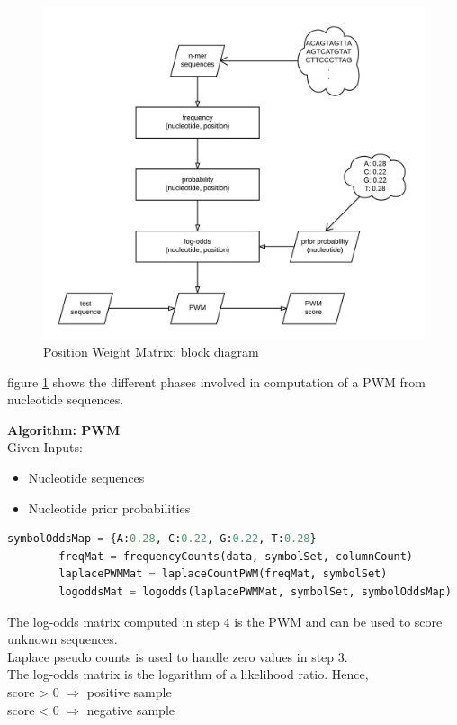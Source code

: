 \documentclass[12pt,a4paper]{article}
\begin{document}
	\begin{figure}[H]
		\label{fig:pwm}
		\includegraphics[width=\textwidth]{"pwm"}
		\caption{Position Weight Matrix: block diagram}
		\centering
	\end{figure}
	
	figure \ref{fig:pwm} shows the different phases involved in computation of a PWM from nucleotide sequences. \par
	\textbf{Algorithm: PWM} \\
	Given Inputs:
	\begin{itemize}
	\item Nucleotide sequences
	\item Nucleotide prior probabilities
	\end{itemize}
	
	\begin{lstlisting}[language=Python]
        symbolOddsMap = {A:0.28, C:0.22, G:0.22, T:0.28}
        freqMat = frequencyCounts(data, symbolSet, columnCount)
        laplacePWMMat = laplaceCountPWM(freqMat, symbolSet)
        logoddsMat = logodds(laplacePWMMat, symbolSet, symbolOddsMap)	
	\end{lstlisting}
	
	The log-odds matrix computed in step 4 is the PWM and can be used to score unknown sequences.\\
	Laplace pseudo counts is used to handle zero values in step 3. \\
	The log-odds matrix is the logarithm of a likelihood ratio. Hence, \\
	score > 0 $\Rightarrow$ positive sample \\
    score < 0 $\Rightarrow$ negative sample
\end{document}
